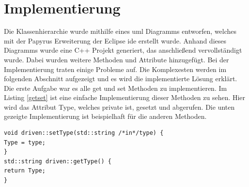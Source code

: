 \section{Implementierung}\label{implement}
Die Klassenhierarchie wurde mithilfe eines \ac{uml} Diagramms entworfen, welches mit der Papyrus Erweiterung der Eclipse \ac{ide} erstellt wurde. Anhand dieses Diagramms wurde eine C++ Projekt generiert, das anschließend vervollständigt wurde. Dabei wurden weitere Methoden und Attribute hinzugefügt. Bei der Implementierung traten einige Probleme auf. Die Komplexesten werden im folgenden Abschnitt aufgezeigt und es wird die implementierte Lösung erklärt.\\
Die erste Aufgabe war es alle \glqq get\grqq{} und \glqq set\grqq{} Methoden zu implementieren.  
Im Listing \ref{getset} ist eine einfache Implementierung dieser Methoden zu sehen. Hier wird das Attribut \glqq Type\grqq{}, welches \glqq private\grqq{} ist, gesetzt und abgerufen. Die unten gezeigte Implementierung ist beispielhaft für die anderen Methoden. 
\begin{lstlisting}[caption =\glqq get\grqq{} und \glqq set\grqq{} Methode ,label=getset]
void driven::setType(std::string /*in*/type) {
Type = type;
}
std::string driven::getType() {
return Type;
}
\end{lstlisting}

